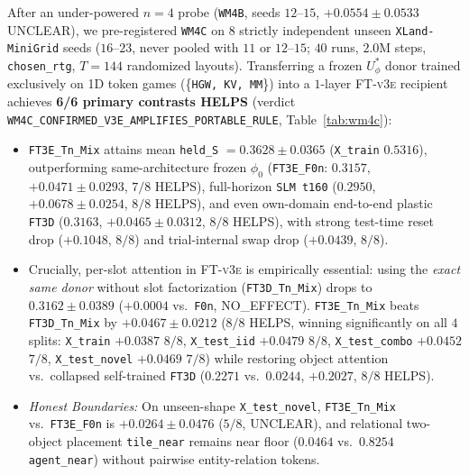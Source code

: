 \documentclass[11pt]{article}
\newcommand{\Uphi}{U_\phi}
\newcommand{\fte}{\textsc{FT-v3e}}
\begin{document}
After an under-powered $n{=}4$ probe (\texttt{WM4B}, seeds $12\text{--}15$, $+0.0554 \pm 0.0533$ \textsc{UNCLEAR}), we pre-registered \texttt{WM4C} on $8$ strictly independent unseen \texttt{XLand-MiniGrid} seeds ($16\text{--}23$, never pooled with $11$ or $12\text{--}15$; $40$ runs, $2.0\text{M}$ steps, \texttt{chosen\_rtg}, $T{=}144$ randomized layouts). Transferring a frozen $\Uphi^*$ donor trained exclusively on 1D token games (\{\texttt{HGW, KV, MM}\}) into a $1$-layer \fte{} recipient achieves \textbf{6/6 primary contrasts \textsc{HELPS}} (verdict \texttt{WM4C\_CONFIRMED\_\allowbreak V3E\_AMPLIFIES\_\allowbreak PORTABLE\_RULE}, Table~\ref{tab:wm4c}):
\begin{itemize}
  \item \texttt{FT3E\_Tn\_Mix} attains mean \texttt{held\_S} $= \mathbf{0.3628 \pm 0.0365}$ (\texttt{X\_train} $0.5316$), outperforming same-architecture frozen $\phi_0$ (\texttt{FT3E\_F0n}: $0.3157$, $\mathbf{+0.0471 \pm 0.0293}$, $7/8$ HELPS), full-horizon \texttt{SLM t160} ($0.2950$, $\mathbf{+0.0678 \pm 0.0254}$, $8/8$ HELPS), and even own-domain end-to-end plastic \texttt{FT3D} ($0.3163$, $\mathbf{+0.0465 \pm 0.0312}$, $8/8$ HELPS), with strong test-time reset drop ($+0.1048$, $8/8$) and trial-internal swap drop ($+0.0439$, $8/8$).
  \item Crucially, per-slot attention in \fte{} is empirically essential: using the \emph{exact same donor} without slot factorization (\texttt{FT3D\_Tn\_Mix}) drops to $0.3162 \pm 0.0389$ ($+0.0004$ vs.\ \texttt{F0n}, \textsc{NO\_EFFECT}). \texttt{FT3E\_Tn\_Mix} beats \texttt{FT3D\_Tn\_Mix} by $\mathbf{+0.0467 \pm 0.0212}$ ($8/8$ HELPS, winning significantly on all $4$ splits: \texttt{X\_train} $+0.0387$ $8/8$, \texttt{X\_test\_iid} $+0.0479$ $8/8$, \texttt{X\_test\_combo} $+0.0452$ $7/8$, \texttt{X\_test\_novel} $+0.0469$ $7/8$) while restoring object attention vs.\ collapsed self-trained \texttt{FT3D} ($0.2271$ vs.\ $0.0244$, $+0.2027$, $8/8$ HELPS).
  \item \emph{Honest Boundaries:} On unseen-shape \texttt{X\_test\_novel}, \texttt{FT3E\_Tn\_Mix} vs.\ \texttt{FT3E\_F0n} is $+0.0264 \pm 0.0476$ ($5/8$, \textsc{UNCLEAR}), and relational two-object placement \texttt{tile\_near} remains near floor ($0.0464$ vs.\ $0.8254$ \texttt{agent\_near}) without pairwise entity-relation tokens.
\end{itemize}
\end{document}
